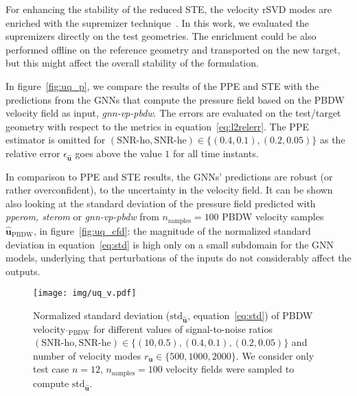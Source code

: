 \begin{rmk}
For enhancing the stability of the reduced STE, the velocity rSVD modes are enriched with the supremizer technique~\cite{ballarin2015supremizer}. 
In this work, we evaluated the supremizers directly on the test geometries. The enrichment could be also performed offline on the reference geometry and transported on the new target, but this might
affect the overall stability of the formulation. 
\end{rmk}

In figure~\ref{fig:uq_p}, we compare the results of the PPE and STE with the predictions from the GNNs that compute the pressure field based on the PBDW velocity field as input, \textit{gnn-vp-pbdw}. The errors are evaluated on the test/target geometry with respect to the metrics in equation~\ref{eq:l2relerr}. The PPE estimator is omitted for $(\text{SNR-ho}, \text{SNR-he})\in \{(0.4, 0.1), (0.2, 0.05)\}$ as the relative error $\epsilon_{\widehat{\mathbf{u}}}$ goes above the value $1$ for all time instants.

In comparison to PPE and STE results, the GNNs' predictions are robust (or rather overconfident), to the uncertainty in the velocity field. It can be shown also looking at the standard deviation of the pressure field predicted with  \textit{pperom, sterom} or \textit{gnn-vp-pbdw} from $n_{\text{samples}}=100$ PBDW velocity samples $\widehat{\mathbf{u}}_{\text{PBDW}}$, in figure~\ref{fig:uq_cfd}: the magnitude of the normalized standard deviation in equation~\eqref{eq:std} is high only on a small subdomain for the GNN models, underlying that perturbations of the inputs do not considerably affect the outputs.

\begin{figure}[!htp]
  \centering
  \texttt{[image: img/uq\_v.pdf]}\\
  \caption{Normalized standard deviation ($\text{std}_{\widehat{\mathbf{u}}}$, equation~\ref{eq:std}) of PBDW velocity $\widehat{}_{\text{PBDW}}$ for different values of signal-to-noise ratios $(\text{SNR-ho}, \text{SNR-he})\in \{(10, 0.5), (0.4, 0.1), (0.2, 0.05)\}$ and number of velocity modes $r_{\mathbf u}\in\{500, 1000, 2000\}$. We consider only test case $n=12$, $n_{\text{samples}}=100$ velocity fields were sampled to compute $\text{std}_{\widehat{\mathbf{u}}}$.}
  \label{fig:snr}
\end{figure}

